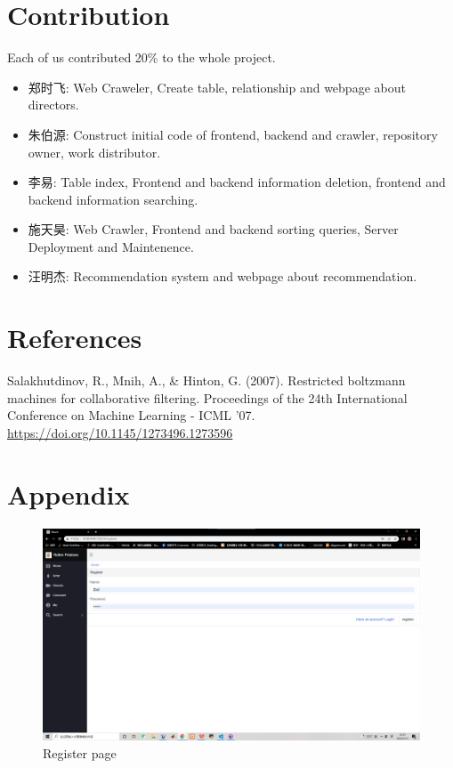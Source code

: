 \begin{CJK*}{UTF8}{gbsn}
\section{Contribution}
Each of us contributed 20\% to the whole project.
\begin{itemize}
    \item 郑时飞:    Web Craweler, Create table, relationship and webpage about directors.
    \item 朱伯源: Construct initial code of frontend, backend and crawler, repository owner, work distributor.
    \item 李易: Table index, Frontend and backend information deletion, frontend and backend information searching.
    \item 施天昊:    Web Crawler, Frontend and backend sorting queries, Server Deployment and Maintenence.
    \item 汪明杰: Recommendation system and webpage about recommendation.
\end{itemize}
\section{References}
Salakhutdinov, R., Mnih, A., \& Hinton, G. (2007). Restricted boltzmann machines for collaborative filtering. Proceedings of the 24th International Conference on Machine Learning - ICML '07. \href{https://doi.org/10.1145/1273496.1273596}{https://doi.org/10.1145/1273496.1273596}
\newpage
\section{Appendix}
\begin{figure}[htbp]
    \centering
    \includegraphics[width=1\textwidth]{reg.png}
    \caption{Register page}
    \end{figure}
    

\end{CJK*}
